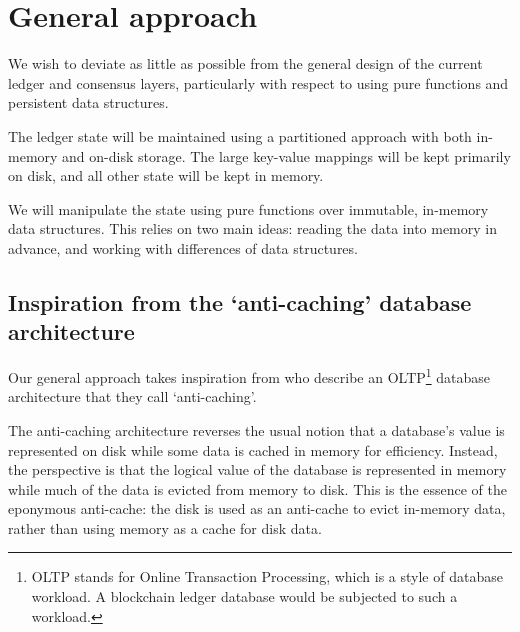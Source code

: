 \documentclass[11pt,a4paper]{article}
\begin{document}
\section{General approach}
\label{general-approach}

We wish to deviate as little as possible from the general design of the current
ledger and consensus layers, particularly with respect to using pure functions
and persistent data structures.

The ledger state will be maintained using a partitioned approach with both
in-memory and on-disk storage. The large key-value mappings will be kept primarily on
disk, and all other state will be kept in memory.

We will manipulate the state using pure functions over immutable, in-memory data
structures. This relies on two main ideas: reading the data into memory in
advance, and working with differences of data structures.

\subsection{Inspiration from the `anti-caching' database architecture}
\label{anti-caching}

Our general approach takes inspiration from \citet{anti-caching} who describe an
OLTP\footnote{OLTP stands for Online Transaction Processing, which is a style of
database workload. A blockchain ledger database would be subjected to such a
workload.} database architecture that they call `anti-caching'.

The anti-caching architecture reverses the usual notion that a database's value
is represented on disk while some data is cached in memory for efficiency.
Instead, the perspective is that the logical value of the database is
represented in memory while much of the data is evicted from memory to disk.
This is the essence of the eponymous anti-cache: the disk is used as an
anti-cache to evict in-memory data, rather than using memory as a cache for disk
data.
\end{document}
